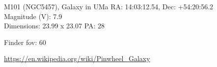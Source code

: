 \begin{block}{M101 (NGC5457), Galaxy in UMa}
    RA: 14:03:12.54, Dec: +54:20:56.2 \\ 
    Magnitude (V): 7.9 \\ 
    Dimensions: 23.99 x 23.07 PA: 28 

    Finder fov: 60 

    \url{https://en.wikipedia.org/wiki/Pinwheel_Galaxy} 
\end{block}